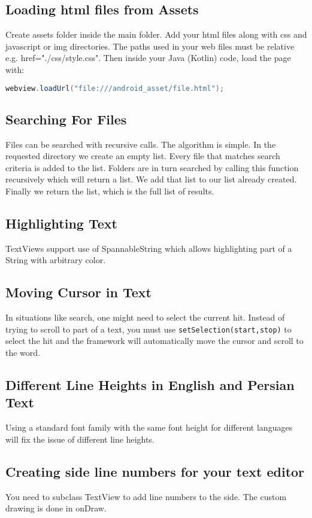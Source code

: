 \documentclass{article}
\begin{document}
\subsection{Loading html files from Assets}
Create assets folder inside the main folder. Add your html files along with css and javascript or img directories. The paths used in your web files must be relative e.g. href="./css/style.css". Then inside your Java (Kotlin) code, load the page with: 
\begin{lstlisting}[language=Java]
webview.loadUrl("file:///android_asset/file.html");
\end{lstlisting}

\subsection{Searching For Files}
Files can be searched with recursive calls. The algorithm is simple. In the requested directory  we create an empty list. Every file that matches search criteria is added to the list. Folders are in turn searched by calling this function recursively which will return a list. We add that list to our list already created. Finally we return the list, which is the full list of results. 

\subsection{Highlighting Text}
TextViews support use of SpannableString which allows highlighting part of a String with arbitrary color. 

\subsection{Moving Cursor in Text}
In situations like search, one might need to select the current hit. Instead of trying to scroll to part of a text, you must use \lstinline{setSelection(start,stop)} to select the hit and the framework will automatically move the cursor and scroll to the word. 


\subsection{Different Line Heights in English and Persian Text}
Using a standard font family with the same font height for different languages will fix the issue of different line heights. 

\subsection{Creating side line numbers for your text editor}
You need to subclass TextView to add line numbers to the side. The custom drawing is done in onDraw. 
\end{document}
